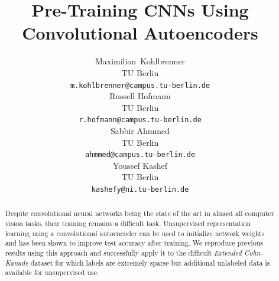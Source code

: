 \documentclass{article}
\title{Pre-Training CNNs Using Convolutional Autoencoders}
\author{
  Maximilian~Kohlbrenner\\
  TU Berlin\\
  \texttt{m.kohlbrenner@campus.tu-berlin.de} \\
  \And
  Russell Hofmann\\
  TU Berlin\\
  \texttt{r.hofmann@campus.tu-berlin.de} \\
  \AND
  Sabbir Ahmmed \\
  TU Berlin \\
  \texttt{ahmmed@campus.tu-berlin.de}\\
  \And
  Youssef Kashef \\
  TU Berlin \\
  \texttt{kashefy@ni.tu-berlin.de}
}
\begin{document}

\maketitle

\begin{abstract}
  Despite convolutional neural networks being the state of the art in almost all computer vision tasks, their training remains a difficult task. Unsupervised representation learning using a convolutional autoencoder can be used to initialize network weights and has been shown to improve test accuracy after training. We reproduce previous results using this approach and successfully apply it to the difficult \emph{Extended Cohn-Kanade} dataset for which labels are extremely sparse but additional unlabeled data is available for unsupervised use.
\end{abstract}
\end{document}

